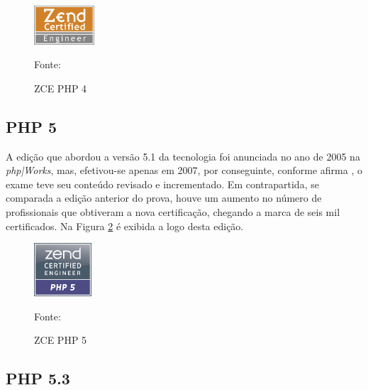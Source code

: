 \begin{figure}[h!tb]
	\caption{ZCE PHP 4}
	\label{fig:logoCertificationPHP4}

	\centering
	\includegraphics[width=0.2\textwidth]{images/logo/php4.png}

	\centering
	\footnotesize Fonte: 
\end{figure}

\FloatBarrier 	%

\subsection{PHP 5}

A edição que abordou a versão 5.1 da tecnologia foi anunciada no ano de
2005 na \textit{php|Works}, mas, efetivou-se apenas em 2007, por conseguinte,
conforme afirma , o exame teve seu conteúdo
revisado e incrementado. Em contrapartida, se comparada a edição anterior do
prova, houve um aumento no número de profissionais que obtiveram a nova
certificação, chegando a marca de seis mil certificados. Na Figura
\ref{fig:logoCertificationPHP5} é exibida a logo desta edição.

\begin{figure}[h!tb]
	\caption{ZCE PHP 5}
	\label{fig:logoCertificationPHP5}

	\centering
	\includegraphics[width=0.19\textwidth]{images/logo/php5.png}

	\centering
	\footnotesize Fonte: 
\end{figure}

\FloatBarrier 	%

\subsection{PHP 5.3}

